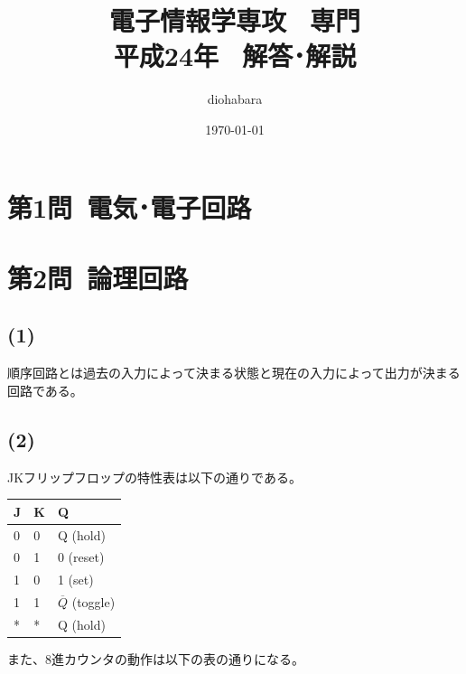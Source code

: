 \documentclass[a4paper,12pt,xelatex,ja=standard]{bxjsarticle}
\title{電子情報学専攻 \, 専門 \\ 平成24年 \, 解答･解説}
\author{diohabara}
\date{\today}
\begin{document}
\maketitle

\section*{第1問\ 電気･電子回路}

\section*{第2問\ 論理回路}
\subsection*{(1)}
順序回路とは過去の入力によって決まる状態と現在の入力によって出力が決まる回路である。

\subsection*{(2)}

JKフリップフロップの特性表は以下の通りである。

\begin{table}[H]
  \begin{tabular}{|l|l|l|}
  \hline
  J & K & Q                  \\ \hline \hline
  0 & 0 & Q (hold)           \\ \hline
  0 & 1 & 0 (reset)          \\ \hline
  1 & 0 & 1 (set)            \\ \hline
  1 & 1 & $\overline{Q}$ (toggle) \\ \hline
  * & * & Q (hold)           \\ \hline
  \end{tabular}
\end{table}

また、8進カウンタの動作は以下の表の通りになる。
\end{document}
